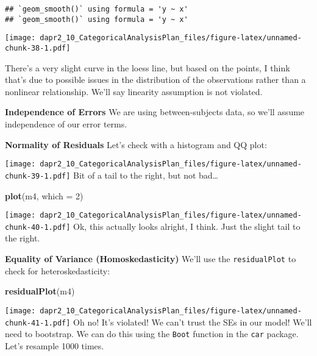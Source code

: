 \documentclass[
]{article}
\newenvironment{Shaded}{\begin{snugshade}}{\end{snugshade}}
\newcommand{\AttributeTok}[1]{\textcolor[rgb]{0.13,0.29,0.53}{#1}}
\newcommand{\DecValTok}[1]{\textcolor[rgb]{0.00,0.00,0.81}{#1}}
\newcommand{\FunctionTok}[1]{\textcolor[rgb]{0.13,0.29,0.53}{\textbf{#1}}}
\newcommand{\NormalTok}[1]{#1}
\newcommand{\SpecialCharTok}[1]{\textcolor[rgb]{0.81,0.36,0.00}{\textbf{#1}}}
\begin{document}
\begin{verbatim}
## `geom_smooth()` using formula = 'y ~ x'
## `geom_smooth()` using formula = 'y ~ x'
\end{verbatim}

\texttt{[image: dapr2\_10\_CategoricalAnalysisPlan\_files/figure-latex/unnamed-chunk-38-1.pdf]}

There's a very slight curve in the loess line, but based on the points, I think that's due to possible issues in the distribution of the observations rather than a nonlinear relationship. We'll say linearity assumption is not violated.

\textbf{Independence of Errors}
We are using between-subjects data, so we'll assume independence of our error terms.

\textbf{Normality of Residuals}
Let's check with a histogram and QQ plot:

\begin{Shaded}
\end{Shaded}

\texttt{[image: dapr2\_10\_CategoricalAnalysisPlan\_files/figure-latex/unnamed-chunk-39-1.pdf]}
Bit of a tail to the right, but not bad\ldots{}

\begin{Shaded}
\begin{Highlighting}[]
\FunctionTok{plot}\NormalTok{(m4, }\AttributeTok{which =} \DecValTok{2}\NormalTok{)}
\end{Highlighting}
\end{Shaded}

\texttt{[image: dapr2\_10\_CategoricalAnalysisPlan\_files/figure-latex/unnamed-chunk-40-1.pdf]}
Ok, this actually looks alright, I think. Just the slight tail to the right.

\textbf{Equality of Variance (Homoskedasticity)}
We'll use the \texttt{residualPlot} to check for heteroskedasticity:

\begin{Shaded}
\begin{Highlighting}[]
\FunctionTok{residualPlot}\NormalTok{(m4)}
\end{Highlighting}
\end{Shaded}

\texttt{[image: dapr2\_10\_CategoricalAnalysisPlan\_files/figure-latex/unnamed-chunk-41-1.pdf]}
Oh no! It's violated! We can't trust the SEs in our model! We'll need to bootstrap. We can do this using the \texttt{Boot} function in the \texttt{car} package. Let's resample 1000 times.
\end{document}
